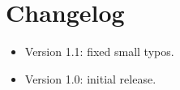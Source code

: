 \chapter{Changelog}
\begin{itemize}
	\item Version 1.1: fixed small typos.
	\item Version 1.0: initial release.
\end{itemize}